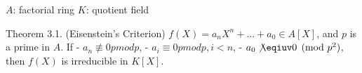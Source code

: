 $A$: factorial ring
$K$: quotient field

Theorem 3.1. (Eisenstein's Criterion)
$f(X) = a_nX^n + ... + a_0 \in A[X]$, and $p$ is a prime in $A$.
If
- $a_n \not\equiv 0 pmod{p}$,
- $a_i \equiv 0 pmod{p}, i < n$,
- $a_0 \not\eqiuv 0 \pmod{p^2}$,
then $f(X)$ is irreducible in $K[X]$.

